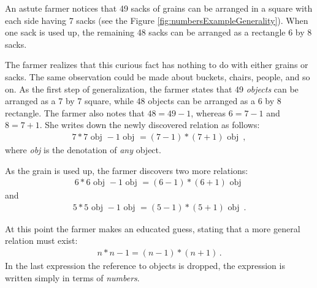 An astute farmer notices that 49 sacks of grains can be arranged
in a square with each side having 7 sacks (see the Figure
\ref{fig:numbersExampleGenerality}). When one sack is used up, the
remaining 48 sacks can be arranged as a rectangle 6 by 8 sacks.

The farmer realizes that this curious fact has nothing to do with
either grains or sacks. The same observation could be made about
buckets, chairs, people, and so on. As the first step of
generalization, the farmer states that 49 \emph{objects} can be
arranged as a 7 by 7 square, while 48 objects can be arranged
as a 6 by 8 rectangle. The farmer also notes that $48=49-1$, whereas
$6=7-1$ and $8=7+1$. She writes down the newly discovered relation as
follows:
\begin{align*}
  7*7\textrm{ obj } - 1\textrm{ obj } = (7-1) * (7+1)\textrm{ obj }\,,
\end{align*}
where \emph{obj} is the denotation of \emph{any} object.

As the grain is used up, the farmer discovers two more relations:
\begin{align*}
  6*6\textrm{ obj } - 1\textrm{ obj } = (6-1) * (6+1)\textrm{ obj }
\end{align*}
and
\begin{align*}
  5*5\textrm{ obj } - 1\textrm{ obj } = (5-1) * (5+1)\textrm{ obj }\,.
\end{align*}

At this point the farmer makes an educated guess, stating that a more
general relation must exist:
\begin{align}
  n*n - 1 = (n-1) * (n+1)\,.
  \label{eq:numbersAlgebraIdentity1}
\end{align}
In the last expression the reference to objects is dropped, the
expression is written simply in terms of \emph{numbers}.

